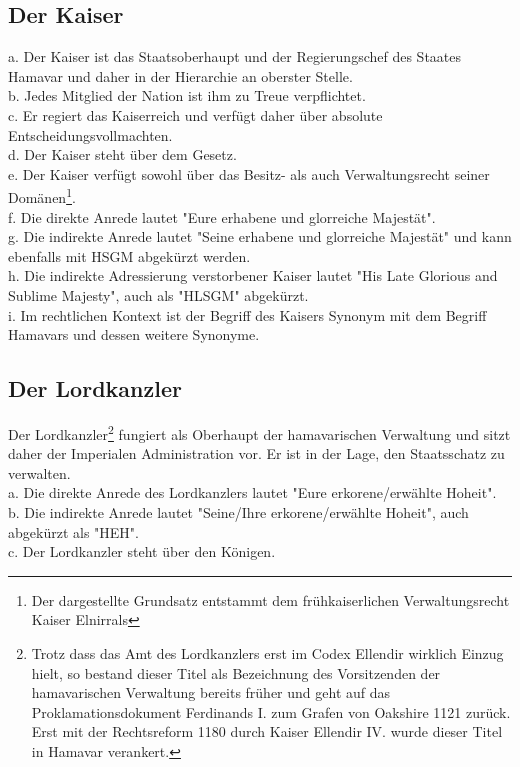 \documentclass{article}
\begin{document}
\subsection{Der Kaiser}
a. Der Kaiser ist das Staatsoberhaupt und der Regierungschef des Staates Hamavar und daher in der Hierarchie an oberster Stelle. \\ 
b. Jedes Mitglied der Nation ist ihm zu Treue verpflichtet.\\
c. Er regiert das Kaiserreich und verfügt daher über absolute Entscheidungsvollmachten.\\
d. Der Kaiser steht über dem Gesetz.\\
e. Der Kaiser verfügt sowohl über das Besitz- als auch Verwaltungsrecht seiner Domänen\footnote{Der dargestellte Grundsatz entstammt dem frühkaiserlichen Verwaltungsrecht Kaiser Elnirrals}.\\
f. Die direkte Anrede lautet "Eure erhabene und glorreiche Majestät".\\
g. Die indirekte Anrede lautet "Seine erhabene und glorreiche Majestät" und kann ebenfalls mit HSGM abgekürzt werden.\\
h. Die indirekte Adressierung verstorbener Kaiser lautet "His Late Glorious and Sublime Majesty", auch als "HLSGM" abgekürzt.\\
i. Im rechtlichen Kontext ist der Begriff des Kaisers Synonym mit dem Begriff Hamavars und dessen weitere Synonyme.

\subsection{Der Lordkanzler}
Der Lordkanzler\footnote{Trotz dass das Amt des Lordkanzlers erst im Codex Ellendir wirklich Einzug hielt, so bestand dieser Titel als Bezeichnung des Vorsitzenden der hamavarischen Verwaltung bereits früher und geht auf das Proklamationsdokument Ferdinands I. zum Grafen von Oakshire 1121 zurück. Erst mit der Rechtsreform 1180 durch Kaiser Ellendir IV. wurde dieser Titel in Hamavar verankert.} fungiert als Oberhaupt der hamavarischen Verwaltung und sitzt daher der Imperialen Administration vor. Er ist in der Lage, den Staatsschatz zu verwalten. \\
a. Die direkte Anrede des Lordkanzlers lautet "Eure erkorene/erwählte Hoheit".\\
b. Die indirekte Anrede lautet "Seine/Ihre erkorene/erwählte Hoheit", auch abgekürzt als "HEH".\\
c. Der Lordkanzler steht über den Königen.
\end{document}
